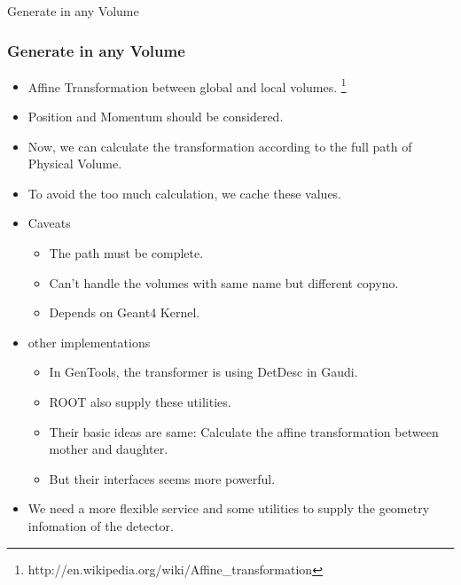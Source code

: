 \begin{frame}
    \begin{center}
        \LARGE Generate in any Volume
    \end{center}
\end{frame}

\begin{frame}
    \frametitle{Generate in any Volume}
    \begin{itemize}
        \item Affine Transformation between global and local volumes.
            \footnote{http://en.wikipedia.org/wiki/Affine\_transformation}
        \item Position and Momentum should be considered.
        \item Now, we can calculate the transformation according to 
              the full path of Physical Volume.
        \item To avoid the too much calculation, we cache these values.
        \item Caveats
            \begin{itemize}
                \item The path must be complete.
                \item Can't handle the volumes with same name 
                        but different copyno.
                \item Depends on Geant4 Kernel.
            \end{itemize}
        \item other implementations
            \begin{itemize}
                \item In GenTools, the transformer is using DetDesc in Gaudi.
                \item ROOT also supply these utilities.
                \item Their basic ideas are same: Calculate the affine
                    transformation between mother and daughter.
                \item But their interfaces seems more powerful.
            \end{itemize}
        \item We need a more flexible service and some utilities 
            to supply the geometry infomation of the detector.
            
    \end{itemize}
\end{frame}
